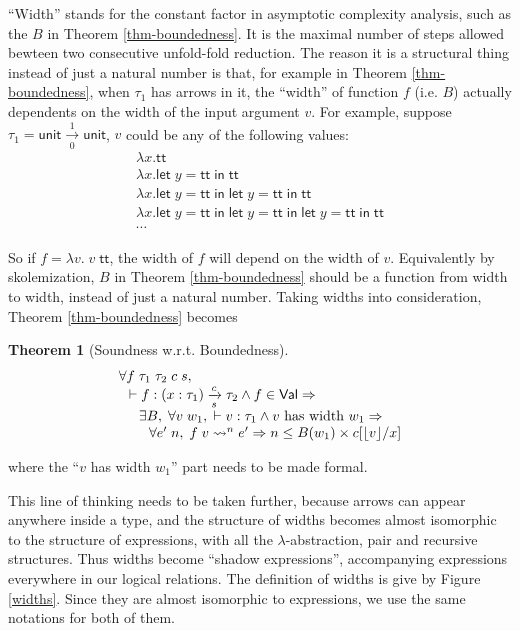 \documentclass[preprint]{sigplanconf}
\newcommand{\arrow}[4]{#1\xrightarrow[#3]{#2}#4}
\newcommand{\symlet}{\mathsf{let\;}}
\newcommand{\symin}{\mathsf{\;in\;}}
\newcommand{\symtt}{\mathsf{tt}}
\newcommand{\symunit}{\mathsf{unit}}
\newcommand{\vtos}[1]{\lfloor #1 \rfloor}
\newtheorem{thm}{Theorem}
\begin{document}
``Width'' stands for the constant factor in asymptotic complexity analysis, such as the $B$ in Theorem \ref{thm-boundedness}. It is the maximal number of steps allowed bewteen two consecutive unfold-fold reduction. The reason it is a structural thing instead of just a natural number is that, for example in Theorem \ref{thm-boundedness}, when $\tau_1$ has arrows in it, the ``width'' of function $f$ (i.e. $B$) actually dependents on the width of the input argument $v$. For example, suppose $\tau_1=\arrow{\symunit}{1}{0}{\symunit}$, $v$ could be any of the following values:
$$
\begin{array}{l}
  \lambda x.\symtt \\
  \lambda x.\symlet y=\symtt\symin\symtt \\
  \lambda x.\symlet y=\symtt\symin\symlet y=\symtt\symin\symtt \\
  \lambda x.\symlet y=\symtt\symin\symlet y=\symtt\symin\symlet y=\symtt\symin\symtt \\
  \cdots
\end{array}
$$

So if $f=\lambda v.\; v\;\symtt$, the width of $f$ will depend on the width of $v$. Equivalently by skolemization, $B$ in Theorem \ref{thm-boundedness} should be a function from width to width, instead of just a natural number. Taking widths into consideration, Theorem \ref{thm-boundedness} becomes
\begin{thm}[\label{thm-boundedness'}Soundness w.r.t. Boundedness]
$$
\begin{array}{l}
\forall f\;\tau_1\;\tau_2\;c\;s, \\
\hspace{0.1in} \vdash f:\arrow{(x:\tau_1)}{c}{s}{\tau_2} \wedge f\in\mathsf{Val}\Rightarrow \\
\hspace{0.2in} \exists B, \;\forall v\;w_1,\; \vdash v:\tau_1 \wedge v\textrm{\ has\ width\ } w_1 \Rightarrow \\
\hspace{0.3in} \forall e'\;n,\; f\;v\leadsto^n e' \Rightarrow n\leq B(w_1)\times c[\vtos{v}/x]
\end{array}
$$
\end{thm}
where the ``$v$ has width $w_1$'' part needs to be made formal.

This line of thinking needs to be taken further, because arrows can appear anywhere inside a type, and the structure of widths becomes almost isomorphic to the structure of expressions, with all the $\lambda$-abstraction, pair and recursive structures. Thus widths become ``shadow expressions'', accompanying expressions everywhere in our logical relations. The definition of widths is give by Figure \ref{widths}. Since they are almost isomorphic to expressions, we use the same notations for both of them.
\end{document}
